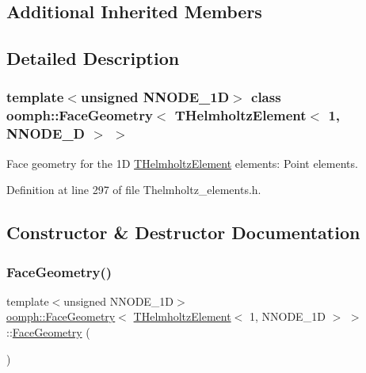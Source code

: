 \subsection*{Additional Inherited Members}


\subsection{Detailed Description}
\subsubsection*{template$<$unsigned N\+N\+O\+D\+E\+\_\+1D$>$\newline
class oomph\+::\+Face\+Geometry$<$ T\+Helmholtz\+Element$<$ 1, N\+N\+O\+D\+E\+\_\+D $>$ $>$}

Face geometry for the 1D \hyperlink{classoomph_1_1THelmholtzElement}{T\+Helmholtz\+Element} elements\+: Point elements. 

Definition at line 297 of file Thelmholtz\+\_\+elements.\+h.



\subsection{Constructor \& Destructor Documentation}
\mbox{\label{classoomph_1_1FaceGeometry_3_01THelmholtzElement_3_011_00_01NNODE__1D_01_4_01_4_abc9da703507aa71a5dd01c16adad9cb5}} 
\subsubsection{\texorpdfstring{Face\+Geometry()}{FaceGeometry()}}
{\footnotesize\ttfamily template$<$unsigned N\+N\+O\+D\+E\+\_\+1D$>$ \\
\hyperlink{classoomph_1_1FaceGeometry}{oomph\+::\+Face\+Geometry}$<$ \hyperlink{classoomph_1_1THelmholtzElement}{T\+Helmholtz\+Element}$<$ 1, N\+N\+O\+D\+E\+\_\+1D $>$ $>$\+::\hyperlink{classoomph_1_1FaceGeometry}{Face\+Geometry} (\begin{DoxyParamCaption}{ }\end{DoxyParamCaption})\hspace{0.3cm}{\ttfamily [inline]}}



